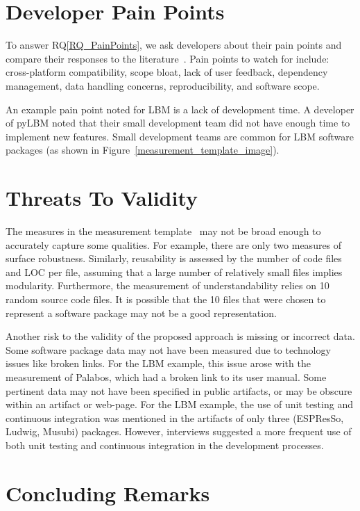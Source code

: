\documentclass[runningheads]{llncs}
\newcommand{\rqref}[1]{RQ\ref{#1}}
\begin{document}
\section{Developer Pain Points} \label{painpoints}

To answer \rqref{RQ_PainPoints}, we ask developers about their pain points and
compare their responses to the literature~\cite{WieseEtAl2019,PintoEtAl2018}.
Pain points to watch for include: cross-platform compatibility, scope bloat,
lack of user feedback, dependency management, data handling concerns,
reproducibility, and software scope. 

An example pain point noted for LBM is a lack of development time. A developer
of pyLBM noted that their small development team did not have enough time to
implement new features. Small development teams are common for LBM software
packages (as shown in Figure~\ref{measurement_template_image}).

\section{Threats To Validity} \label{threats}

The measures in the measurement template~\cite{SmithEtAl2021} may not be broad
enough to accurately capture some qualities. For example, there are only two
measures of surface robustness. Similarly, reusability is assessed by the number
of code files and LOC per file, assuming that a large number of relatively small
files implies modularity. Furthermore, the measurement of understandability
relies on 10 random source code files. It is possible that the 10 files that
were chosen to represent a software package may not be a good representation.

Another risk to the validity of the proposed approach is missing or incorrect
data. Some software package data may not have been measured due to technology
issues like broken links. For the LBM example, this issue arose with the
measurement of Palabos, which had a broken link to its user manual. Some
pertinent data may not have been specified in public artifacts, or may be
obscure within an artifact or web-page. For the LBM example, the use of unit
testing and continuous integration was mentioned in the artifacts of only three
(ESPResSo, Ludwig, Musubi) packages. However, interviews suggested a more
frequent use of both unit testing and continuous integration in the development
processes.

\section{Concluding Remarks} \label{SecConcludingRemarks}
\end{document}
